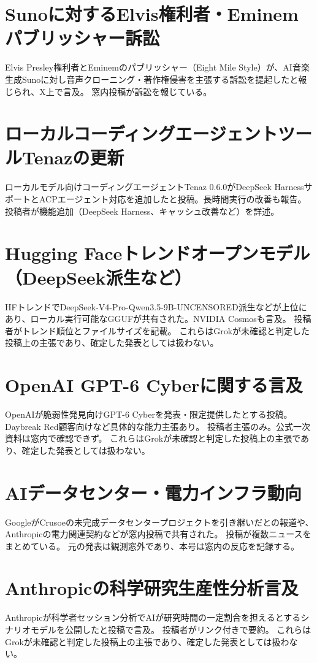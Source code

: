 \section{Sunoに対するElvis権利者・Eminemパブリッシャー訴訟}
Elvis Presley権利者とEminemのパブリッシャー（Eight Mile Style）が、AI音楽生成Sunoに対し音声クローニング・著作権侵害を主張する訴訟を提起したと報じられ、X上で言及。 窓内投稿が訴訟を報じている。

\section{ローカルコーディングエージェントツールTenazの更新}
ローカルモデル向けコーディングエージェントTenaz 0.6.0がDeepSeek HarnessサポートとACPエージェント対応を追加したと投稿。長時間実行の改善も報告。 投稿者が機能追加（DeepSeek Harness、キャッシュ改善など）を詳述。

\section{Hugging Faceトレンドオープンモデル（DeepSeek派生など）}
HFトレンドでDeepSeek-V4-Pro-Qwen3.5-9B-UNCENSORED派生などが上位にあり、ローカル実行可能なGGUFが共有された。NVIDIA Cosmosも言及。 投稿者がトレンド順位とファイルサイズを記載。 これらはGrokが未確認と判定した投稿上の主張であり、確定した発表としては扱わない。

\section{OpenAI GPT-6 Cyberに関する言及}
OpenAIが脆弱性発見向けGPT-6 Cyberを発表・限定提供したとする投稿。Daybreak Red顧客向けなど具体的な能力主張あり。 投稿者主張のみ。公式一次資料は窓内で確認できず。 これらはGrokが未確認と判定した投稿上の主張であり、確定した発表としては扱わない。

\section{AIデータセンター・電力インフラ動向}
GoogleがCrusoeの未完成データセンタープロジェクトを引き継いだとの報道や、Anthropicの電力関連契約などが窓内投稿で共有された。 投稿が複数ニュースをまとめている。 元の発表は観測窓外であり、本号は窓内の反応を記録する。

\section{Anthropicの科学研究生産性分析言及}
Anthropicが科学者セッション分析でAIが研究時間の一定割合を担えるとするシナリオモデルを公開したと投稿で言及。 投稿者がリンク付きで要約。 これらはGrokが未確認と判定した投稿上の主張であり、確定した発表としては扱わない。
